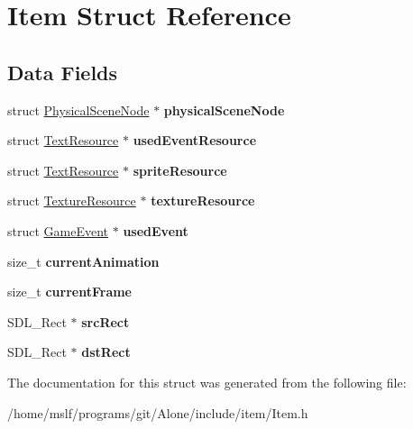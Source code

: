\hypertarget{struct_item}{}\section{Item Struct Reference}
\label{struct_item}
\subsection*{Data Fields}
\begin{DoxyCompactItemize}
\item 
\hypertarget{struct_item_a56a0370780499062e6f778b7539adfda}{}\label{struct_item_a56a0370780499062e6f778b7539adfda} 
struct \hyperlink{struct_physical_scene_node}{Physical\+Scene\+Node} $\ast$ {\bfseries physical\+Scene\+Node}
\item 
\hypertarget{struct_item_a9ea528b1f7f8a0cecf1125c2515c3cf9}{}\label{struct_item_a9ea528b1f7f8a0cecf1125c2515c3cf9} 
struct \hyperlink{struct_text_resource}{Text\+Resource} $\ast$ {\bfseries used\+Event\+Resource}
\item 
\hypertarget{struct_item_ac402150bd2243d7a6f04756f7b624fa1}{}\label{struct_item_ac402150bd2243d7a6f04756f7b624fa1} 
struct \hyperlink{struct_text_resource}{Text\+Resource} $\ast$ {\bfseries sprite\+Resource}
\item 
\hypertarget{struct_item_aedd0da0c072332f83e64105f8682bbdf}{}\label{struct_item_aedd0da0c072332f83e64105f8682bbdf} 
struct \hyperlink{struct_texture_resource}{Texture\+Resource} $\ast$ {\bfseries texture\+Resource}
\item 
\hypertarget{struct_item_aca12a18a790b1a1e2f33383502f8c054}{}\label{struct_item_aca12a18a790b1a1e2f33383502f8c054} 
struct \hyperlink{struct_game_event}{Game\+Event} $\ast$ {\bfseries used\+Event}
\item 
\hypertarget{struct_item_a712df7aeb9afad06723b1d6039536010}{}\label{struct_item_a712df7aeb9afad06723b1d6039536010} 
size\+\_\+t {\bfseries current\+Animation}
\item 
\hypertarget{struct_item_a3ff28beecee781f499b33b0884780b85}{}\label{struct_item_a3ff28beecee781f499b33b0884780b85} 
size\+\_\+t {\bfseries current\+Frame}
\item 
\hypertarget{struct_item_a7ad203f83ba9f4362e9fdd624df60090}{}\label{struct_item_a7ad203f83ba9f4362e9fdd624df60090} 
S\+D\+L\+\_\+\+Rect $\ast$ {\bfseries src\+Rect}
\item 
\hypertarget{struct_item_a7c80019eb2315edac6e37bf0e68cbe71}{}\label{struct_item_a7c80019eb2315edac6e37bf0e68cbe71} 
S\+D\+L\+\_\+\+Rect $\ast$ {\bfseries dst\+Rect}
\end{DoxyCompactItemize}


The documentation for this struct was generated from the following file\+:\begin{DoxyCompactItemize}
\item 
/home/mslf/programs/git/\+Alone/include/item/Item.\+h\end{DoxyCompactItemize}
